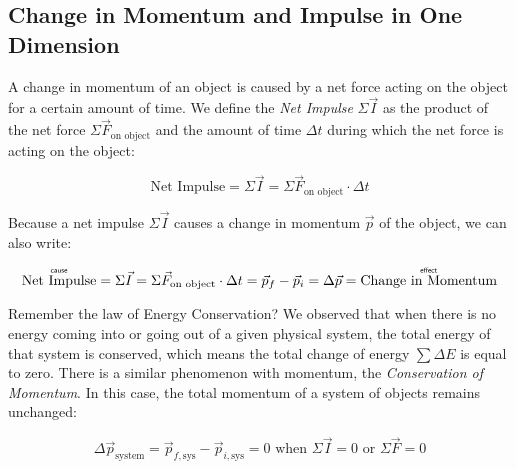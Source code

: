 \WCD

\subsection{Change in Momentum and Impulse in One Dimension}
\label{act7.1.1a}


A change in momentum of an object is caused by a net force acting on the object for a certain amount of time. We define the \emph{Net Impulse} $\Sigma\vec{I}$ as the product of the net force $\Sigma\vec{F}_\text{on object}$ and the amount of time $\Delta t$ during which the net force is acting on the object:
\vspace{-5pt}

\begin{equation*}
	\text{Net Impulse} = \Sigma\vec{I} = \Sigma\vec{F}_\text{on object} \cdot \Delta t
\end{equation*}

\noindent Because a net impulse $\Sigma\vec{I}$ causes a change in momentum $\vec{p}$ of the object, we can also write:
\vspace{-10pt}

\begin{equation*}
	\overset{\mbox{\normalfont\tiny\sffamily cause}}{\text{Net Impulse}} = \Sigma\vec{I} = \Sigma\vec{F}_\text{on object} \cdot \Delta t = \vec{p}_f - \vec{p}_i = \Delta\vec{p} = \overset{\mbox{\normalfont\tiny\sffamily effect}}{\text{Change in Momentum}}
\end{equation*}

\noindent Remember the law of Energy Conservation? We observed that when there is no energy coming into or going out of a given physical system, the total energy of that system is conserved, which means the total change of energy $\sum\Delta E$ is equal to zero. There is a similar phenomenon with momentum, the \emph{Conservation of Momentum}. In this case, the total momentum of a system of objects remains unchanged:
\vspace{-5pt}

\begin{equation*}
	\Delta \vec{p}_\text{system} = \vec{p}_{f,\text{sys}} - \vec{p}_{i,\text{sys}} = 0 \text{  when  } \Sigma\vec{I} = 0 \text{  or  } \Sigma\vec{F} = 0	
\end{equation*}

